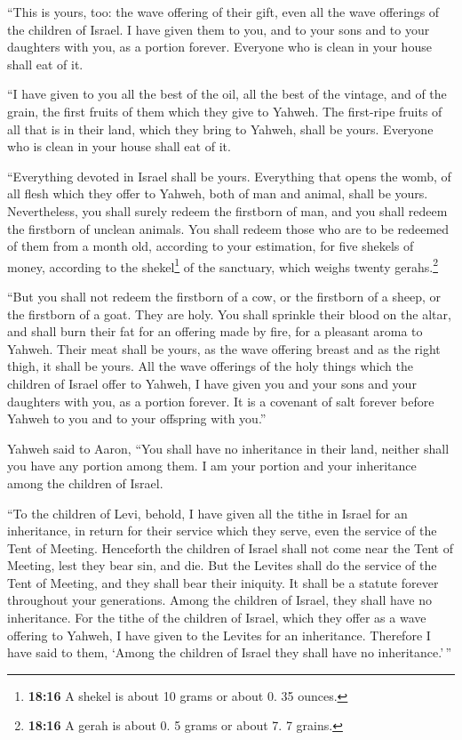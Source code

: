  ``This is yours, too: the wave offering of their gift,
even all the wave offerings of the children of Israel. I have given them
to you, and to your sons and to your daughters with you, as a portion
forever. Everyone who is clean in your house shall eat of it.

 ``I have given to you all the best of the oil, all the
best of the vintage, and of the grain, the first fruits of them which
they give to Yahweh.  The first-ripe fruits of all that
is in their land, which they bring to Yahweh, shall be yours. Everyone
who is clean in your house shall eat of it.

 ``Everything devoted in Israel shall be yours.
 Everything that opens the womb, of all flesh which they
offer to Yahweh, both of man and animal, shall be yours. Nevertheless,
you shall surely redeem the firstborn of man, and you shall redeem the
firstborn of unclean animals.  You shall redeem those who
are to be redeemed of them from a month old, according to your
estimation, for five shekels of money, according to the
shekel\footnote{\textbf{18:16} A shekel is about 10 grams or about 0. 35
  ounces.} of the sanctuary, which weighs twenty gerahs.\footnote{\textbf{18:16}
  A gerah is about 0. 5 grams or about 7. 7 grains.}

 ``But you shall not redeem the firstborn of a cow, or
the firstborn of a sheep, or the firstborn of a goat. They are holy. You
shall sprinkle their blood on the altar, and shall burn their fat for an
offering made by fire, for a pleasant aroma to Yahweh. 
Their meat shall be yours, as the wave offering breast and as the right
thigh, it shall be yours.  All the wave offerings of the
holy things which the children of Israel offer to Yahweh, I have given
you and your sons and your daughters with you, as a portion forever. It
is a covenant of salt forever before Yahweh to you and to your offspring
with you.''

 Yahweh said to Aaron, ``You shall have no inheritance in
their land, neither shall you have any portion among them. I am your
portion and your inheritance among the children of Israel.

 ``To the children of Levi, behold, I have given all the
tithe in Israel for an inheritance, in return for their service which
they serve, even the service of the Tent of Meeting. 
Henceforth the children of Israel shall not come near the Tent of
Meeting, lest they bear sin, and die.  But the Levites
shall do the service of the Tent of Meeting, and they shall bear their
iniquity. It shall be a statute forever throughout your generations.
Among the children of Israel, they shall have no inheritance.
 For the tithe of the children of Israel, which they
offer as a wave offering to Yahweh, I have given to the Levites for an
inheritance. Therefore I have said to them, `Among the children of
Israel they shall have no inheritance.'\,''

